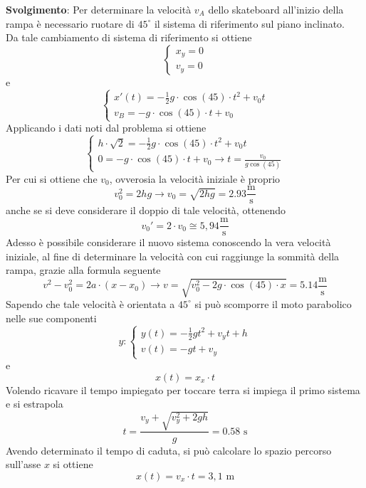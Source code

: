 \documentclass[a4paper]{extarticle}
\begin{document}
\vspace{1em}
\noindent
\textbf{Svolgimento}: Per determinare la velocità $v_A$ dello skateboard all'inizio della rampa è necessario ruotare di $45^\circ$ il sistema di riferimento sul piano inclinato.\\
Da tale cambiamento di sistema di riferimento si ottiene
\[
  \left\{
    \begin{array}{ll}
      x_y = 0\\
      v_y = 0
    \end{array}
  \right.
\]
e
\[
  \left\{
    \begin{array}{ll}
      x'(t) = -\frac{1}{2} g \cdot \cos(45) \cdot t^2 + v_0 t\\
      v_B = - g \cdot \cos(45) \cdot t + v_0
    \end{array}
  \right.
\]
Applicando i dati noti dal problema si ottiene
\[
  \left\{
    \begin{array}{ll}
      h \cdot \sqrt{2} = -\frac{1}{2} g \cdot \cos(45) \cdot t^2 + v_0 t\\
      0 = - g \cdot \cos(45) \cdot t + v_0 \longrightarrow t = \frac{v_0}{g \cos(45)}
    \end{array}
  \right.
\]
Per cui si ottiene che $v_0$, ovverosia la velocità iniziale è proprio
\[v_0^2 = 2 h g \longrightarrow v_0 = \sqrt{2 h g} = 2.93 \frac{\text{m}}{\text{s}}\]
anche se si deve considerare il doppio di tale velocità, ottenendo
\[v_0' = 2 \cdot v_0 \cong 5,94 \frac{\text{m}}{\text{s}}\]
Adesso è possibile considerare il nuovo sistema conoscendo la vera velocità iniziale, al fine di determinare la velocità con cui raggiunge la sommità della rampa, grazie alla formula seguente
\[v^2 - v_0^2 = 2a \cdot (x - x_0) \longrightarrow v = \sqrt{v_0^2 - 2 g \cdot \cos(45) \cdot x} = 5.14 \frac{\text{m}}{\text{s}}\]
Sapendo che tale velocità è orientata a $45^\circ$ si può scomporre il moto parabolico nelle sue componenti
\[
  y : \left\{
    \begin{array}{ll}
      y(t) = - \frac{1}{2} g t^2 + v_y t + h\\
      v(t) = - g t + v_y
    \end{array}
  \right.
\]
e
\[x(t) = x_x \cdot t\]
Volendo ricavare il tempo impiegato per toccare terra si impiega il primo sistema e si estrapola
\[t = \frac{v_y + \sqrt{v_y^2 + 2gh}}{g} = 0.58 \text{ s}\]
Avendo determinato il tempo di caduta, si può calcolare lo spazio percorso sull'asse $x$ si ottiene
\[x(t) = v_x \cdot t = 3,1 \text{ m}\]
\end{document}
